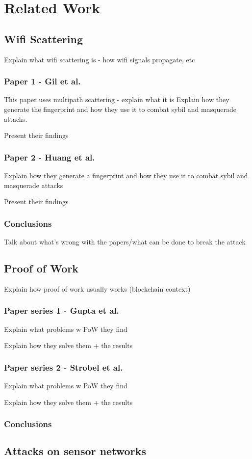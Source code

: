 \chapter{Related Work}


\section{Wifi Scattering}
Explain what wifi scattering is - how wifi signals propagate, etc

\subsection{Paper 1 - Gil et al.}
This paper uses multipath scattering - explain what it is
Explain how they generate the fingerprint and how they use it to combat sybil and masquerade attacks.

Present their findings


\subsection{Paper 2 - Huang et al.}

Explain how they generate a fingerprint and how they use it to combat sybil and masquerade attacks

Present their findings

\subsection{Conclusions}

Talk about what's wrong with the papers/what can be done to break the attack

\section{Proof of Work}
Explain how proof of work usually works (blockchain context)

\subsection{Paper series 1 - Gupta et al.}
Explain what problems w PoW they find

Explain how they solve them + the results

\subsection{Paper series 2 - Strobel et al.}

Explain what problems w PoW they find

Explain how they solve them + the results

\subsection{Conclusions}

\section{Attacks on sensor networks}

